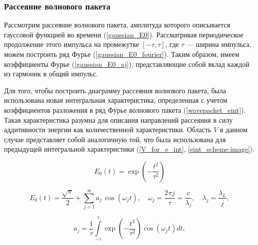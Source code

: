\subsubsection{Рассеяние волнового пакета}

Рассмотрим рассеяние волнового пакета, амплитуда которого описывается гауссовой функцией во времени (\autoref{gaussian_E0}). Рассматривая периодическое продолжение этого импульса на промежутке $[-\tau, \tau]$, где $\tau$ --- ширина импульса, можем построить ряд Фурье (\autoref{gaussian_E0_fourier}). Таким образом, имеем коэффициенты Фурье (\autoref{gaussian_E0_aj}), представляющие собой вклад каждой из гармоник в общий импульс.

Для того, чтобы построить диаграмму рассеяния волнового пакета, была использована новая интегральная характеристика, определенная с учетом коэффициентов разложения в ряд Фурье волнового пакета (\autoref{wavepacket_eint}). Такая характеристика разумна для описания направлений рассеяния в силу аддитивности энергии как количественной характеристики. Область $V$ в данном случае представляет собой аналогичную той, что была использована для предыдущей интегральной характеристики (\autoref{V_for_e_int}, \autoref{eint_scheme:image}).

    \begin{equation}
        E_0\left( t \right) = \exp{\left( - \frac{t^2}{\tau^2}\right)}
        \label{gaussian_E0}
    \end{equation}

    \begin{equation}
        E_0\left( t \right) = \frac{\sqrt{\pi}}{2} + \sum_{j = 1}^{\infty}{ a_j \, \cos{\left(\omega_j t \right)}}, \quad \omega_j = \frac{2 \pi j}{\tau} = \frac{c}{\lambda_j}, \quad \lambda_{j} = \frac{\lambda_{L}}{j},
        \label{gaussian_E0_fourier}
    \end{equation}

    \begin{equation}
        a_j = \frac{1}{\tau} \int\limits_{-\tau}^{\tau}  \exp{\left( - \frac{t^2}{\tau^2}\right)} \cos{\left(\omega_j t \right)} dt,
        \label{gaussian_E0_aj}
    \end{equation}



